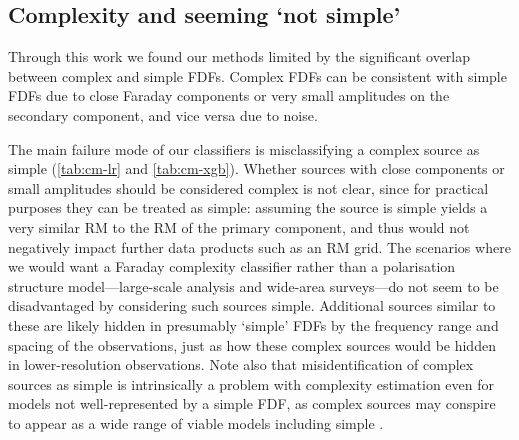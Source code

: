   \subsection{Complexity and seeming `not simple'}
  \label{sec:faraday-overlap}

    Through this work we found our methods limited by the significant overlap between complex and simple FDFs. Complex FDFs can be consistent with simple FDFs due to close Faraday components or very small amplitudes on the secondary component, and vice versa due to noise.


    The main failure mode of our classifiers is misclassifying a complex source as simple (\autoref{tab:cm-lr} and \autoref{tab:cm-xgb}). Whether sources with close components or small amplitudes should be considered complex is not clear, since for practical purposes they can be treated as simple: assuming the source is simple yields a very similar RM to the RM of the primary component, and thus would not negatively impact further data products such as an RM grid. The scenarios where we would want a Faraday complexity classifier rather than a polarisation structure model---large-scale analysis and wide-area surveys---do not seem to be disadvantaged by considering such sources simple. Additional sources similar to these are likely hidden in presumably `simple' FDFs by the frequency range and spacing of the observations, just as how these complex sources would be hidden in lower-resolution observations. Note also that misidentification of complex sources as simple is intrinsically a problem with complexity estimation even for models not well-represented by a simple FDF, as complex sources may conspire to appear as a wide range of viable models including simple \citep{sun15comparison}.


